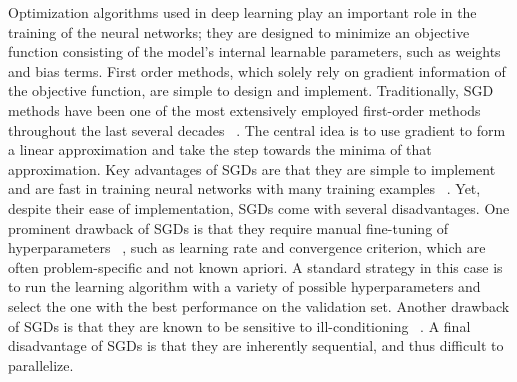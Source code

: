 \documentclass[10pt,twocolumn,letterpaper]{article}
\begin{document}
Optimization algorithms used in deep learning play an important role in the training of the neural networks; they are designed to minimize an objective function consisting of the model's internal learnable parameters, such as weights and bias terms. First order methods, which solely rely on gradient information of the objective function, are simple to design and implement. Traditionally, SGD methods have been one of the most  extensively employed first-order methods throughout the last several decades ~\cite{LeCun98, Zinkevich10}. The central idea is to use gradient to form a linear approximation and take the step towards the minima of that approximation. Key advantages of SGDs are that they are simple to implement and are fast in training neural networks with many training examples ~\cite{Bottou10}. Yet, despite their ease of implementation, SGDs come with several disadvantages. One prominent drawback of SGDs is that they require manual fine-tuning of hyperparameters ~\cite{Berahas17}, such as learning rate and convergence criterion, which are often problem-specific and not known apriori. A standard strategy in this case is to run the learning algorithm with a variety of possible hyperparameters and select the one with the best performance on the validation set. Another drawback of SGDs is that they are known to be sensitive to ill-conditioning ~\cite{Roosta-Khorasani16}. A final disadvantage of SGDs is that they are inherently sequential, and thus difficult to parallelize.
\end{document}
